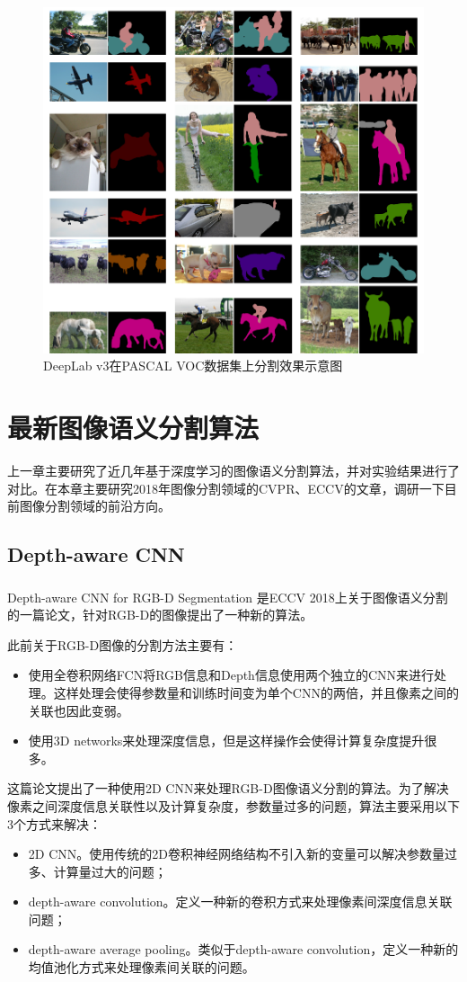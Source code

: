 \documentclass[cn]{elegantbook}
\newcommand{\upcite}[1]{\textsuperscript{\textsuperscript{\cite{#1}}}}
\begin{document}
\begin{figure}[h]
	\centering
	\includegraphics[width=\textwidth]{images/allresults.png}
	\caption{\label{result1}DeepLab v3在PASCAL VOC数据集上分割效果示意图}
\end{figure}

\chapter{最新图像语义分割算法}
上一章主要研究了近几年基于深度学习的图像语义分割算法，并对实验结果进行了对比。在本章主要研究2018年图像分割领域的CVPR、ECCV的文章，调研一下目前图像分割领域的前沿方向。

\section{Depth-aware CNN}
Depth-aware CNN for RGB-D Segmentation\upcite{wang2018depth} 是ECCV 2018上关于图像语义分割的一篇论文，针对RGB-D的图像提出了一种新的算法。

此前关于RGB-D图像的分割方法主要有：
\begin{itemize}
	\item 使用全卷积网络FCN将RGB信息和Depth信息使用两个独立的CNN来进行处理。这样处理会使得参数量和训练时间变为单个CNN的两倍，并且像素之间的关联也因此变弱。
	\item 使用3D networks来处理深度信息，但是这样操作会使得计算复杂度提升很多。
\end{itemize}
这篇论文提出了一种使用2D CNN来处理RGB-D图像语义分割的算法。为了解决像素之间深度信息关联性以及计算复杂度，参数量过多的问题，算法主要采用以下3个方式来解决：
\begin{itemize}
	\item 2D CNN。使用传统的2D卷积神经网络结构不引入新的变量可以解决参数量过多、计算量过大的问题；
	\item depth-aware convolution。定义一种新的卷积方式来处理像素间深度信息关联问题；
	\item depth-aware average pooling。类似于depth-aware convolution，定义一种新的均值池化方式来处理像素间关联的问题。
\end{itemize}
\end{document}
